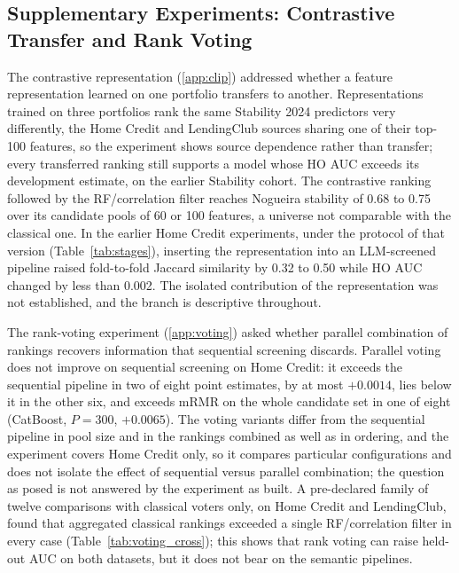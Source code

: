 \documentclass[final,5p,twocolumn]{elsarticle}
\begin{document}
\subsection{Supplementary Experiments: Contrastive Transfer and Rank Voting}
\label{subsec:supplementary_discussion}

The contrastive representation (\ref{app:clip}) addressed whether a feature representation learned on one portfolio transfers to another. Representations trained on three portfolios rank the same Stability 2024 predictors very differently, the Home Credit and LendingClub sources sharing one of their top-100 features, so the experiment shows source dependence rather than transfer; every transferred ranking still supports a model whose HO AUC exceeds its development estimate, on the earlier Stability cohort. The contrastive ranking followed by the RF/correlation filter reaches Nogueira stability of 0.68 to 0.75 over its candidate pools of 60 or 100 features, a universe not comparable with the classical one. In the earlier Home Credit experiments, under the protocol of that version (Table~\ref{tab:stages}), inserting the representation into an LLM-screened pipeline raised fold-to-fold Jaccard similarity by 0.32 to 0.50 while HO AUC changed by less than 0.002. The isolated contribution of the representation was not established, and the branch is descriptive throughout.

The rank-voting experiment (\ref{app:voting}) asked whether parallel combination of rankings recovers information that sequential screening discards. Parallel voting does not improve on sequential screening on Home Credit: it exceeds the sequential pipeline in two of eight point estimates, by at most $+0.0014$, lies below it in the other six, and exceeds mRMR on the whole candidate set in one of eight (CatBoost, $P=300$, $+0.0065$). The voting variants differ from the sequential pipeline in pool size and in the rankings combined as well as in ordering, and the experiment covers Home Credit only, so it compares particular configurations and does not isolate the effect of sequential versus parallel combination; the question as posed is not answered by the experiment as built. A pre-declared family of twelve comparisons with classical voters only, on Home Credit and LendingClub, found that aggregated classical rankings exceeded a single RF/correlation filter in every case (Table~\ref{tab:voting_cross}); this shows that rank voting can raise held-out AUC on both datasets, but it does not bear on the semantic pipelines.
\end{document}
